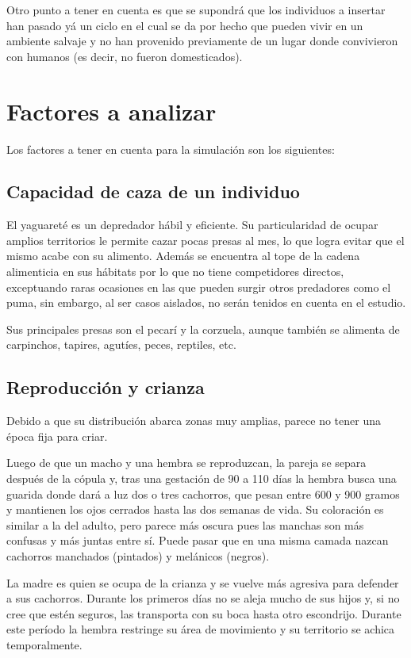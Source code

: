     Otro punto a tener en cuenta es que se supondrá que los individuos a insertar han pasado yá un ciclo en el cual se da por hecho que pueden vivir en un ambiente salvaje y no han provenido previamente de un lugar donde convivieron con humanos (es decir, no fueron domesticados).

\section{Factores a analizar}
    Los factores a tener en cuenta para la simulación son los siguientes:
    
   \subsection{Capacidad de caza de un individuo}
    El yaguareté es un depredador hábil y eficiente. Su particularidad de ocupar amplios territorios le permite cazar pocas presas al mes, lo que logra evitar que el mismo acabe con su alimento. Además se encuentra al tope de la cadena alimenticia en sus hábitats por lo que no tiene competidores directos, exceptuando raras ocasiones en las que pueden surgir otros predadores como el puma, sin embargo, al ser casos aislados, no serán tenidos en cuenta en el estudio.
    
    Sus principales presas son el pecarí y la corzuela, aunque también se alimenta de carpinchos, tapires, agutíes, peces, reptiles, etc.
    
    \subsection{Reproducción y crianza}
    Debido a que su distribución abarca zonas muy amplias, parece no tener una época fija para criar.
    
    Luego de que un macho y una hembra se reproduzcan, la pareja se separa después de la cópula y, tras una gestación de 90 a 110 días la hembra busca una guarida donde dará a luz dos o tres cachorros, que pesan entre 600 y 900 gramos y mantienen los ojos cerrados hasta las dos semanas de vida. Su coloración es similar a la del adulto, pero parece más oscura pues las manchas son más confusas y más juntas entre sí. Puede pasar que en una misma camada nazcan cachorros manchados (pintados) y melánicos (negros).
    
    La madre es quien se ocupa de la crianza y se vuelve más agresiva para defender a sus cachorros. Durante los primeros días no se aleja mucho de sus hijos y, si no cree que estén seguros, las transporta con su boca hasta otro escondrijo. Durante este período la hembra restringe su área de movimiento y su territorio se achica temporalmente.
    
